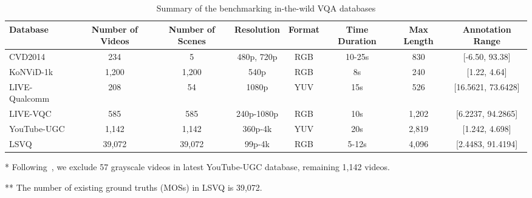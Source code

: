 \documentclass[journal]{IEEEtran}
\begin{document}
{{\begin{table*}[!htbp]
  \centering
  \caption{Summary of the benchmarking in-the-wild VQA databases}\label{Table:VQAdatabase}
  \begin{threeparttable}
  \begin{tabular}{l|ccccccc}
    \toprule
        {\bf Database} & Number of Videos & Number of Scenes & Resolution & Format & Time Duration & Max Length & Annotation Range \\
    \hline
        CVD2014~\cite{nuutinen2016cvd2014}         &    234  &      5 & 480p, 720p & RGB & 10-25s & 830 & [-6.50, 93.38] \\
        KoNViD-1k~\cite{hosu2017konstanz}          &  1,200  &  1,200 & 540p & RGB & 8s & 240 & [1.22, 4.64] \\
        LIVE-Qualcomm~\cite{ghadiyaram2018capture} &    208  &     54 & 1080p & YUV & 15s & 526 & [16.5621, 73.6428] \\
        LIVE-VQC~\cite{sinno2019large}             &    585  &    585 & 240p-1080p & RGB & 10s & 1,202 & [6.2237, 94.2865] \\
        YouTube-UGC~\cite{wang2019youtube}         &  1,142\tnote{*}  &  1,142 & 360p-4k & YUV & 20s & 2,819 & [1.242, 4.698] \\
        LSVQ~\cite{ying2021patch}                  & 39,072\tnote{**}  & 39,072 &  99p-4k & RGB & 5-12s & 4,096 & [2.4483, 91.4194]\\
    \bottomrule
  \end{tabular}
  \begin{tablenotes}
        \footnotesize
        \item[*] Following~\cite{wang2019youtube}, we exclude 57 grayscale videos in latest YouTube-UGC database, remaining 1,142 videos.
        \item[**] The number of existing ground truths (MOSs) in LSVQ is 39,072.
  \end{tablenotes}
  \end{threeparttable}
\end{table*}





}}
\end{document}

